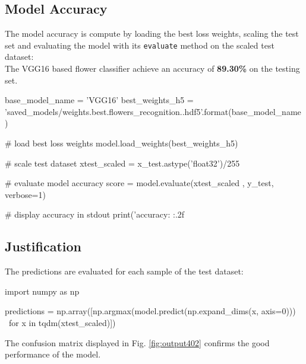 \subsection{Model Accuracy}

The model accuracy is compute by loading the best loss weights, scaling the test set and evaluating the model with its \texttt{evaluate} method on the scaled test dataset:
\\
The VGG16 based flower classifier achieve an accuracy of \textbf{89.30\%} on the testing set.

\begin{python}
base_model_name = 'VGG16'
best_weights_h5 = 'saved_models/weights.best.flowers_recognition.{}.hdf5'.format(base_model_name)

# load best loss weights
model.load_weights(best_weights_h5)	

# scale test dataset
xtest_scaled = x_test.astype('float32')/255

# evaluate model accuracy
score = model.evaluate(xtest_scaled , y_test, verbose=1)

# display accuracy in stdout
print('\nTest accuracy: {:.2f}%
\end{python}

\subsection{Justification}

The predictions are evaluated for each sample of the test dataset:


\begin{python}
import numpy as np

predictions = np.array([np.argmax(model.predict(np.expand_dims(x, axis=0))) \
	for x in tqdm(xtest_scaled)])
\end{python}

The confusion matrix displayed in Fig. \ref{fig:output402} confirms the good performance of the model.

